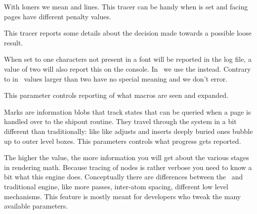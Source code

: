 \stopnewprimitive

\startnewprimitive[title={\prm {tracingloners}}]

With loners we mean  and  lines. This tracer can be
handy when  is set and facing pages have different
penalty values.

\stopnewprimitive

\startnewprimitive[title={\prm {tracinglooseness}}]

This tracer reports some details about the decision made towards a possible
loose result.

\stopnewprimitive

\startoldprimitive[title={\prm {tracinglostchars}}]

When set to one characters not present in a font will be reported in the log
file, a value of two will also report this on the console. In \CONTEXT\ we use
the  instead. Contrary to in \LUATEX\ values larger than
two have no special meaning and we don't error.

\stopoldprimitive

\startoldprimitive[title={\prm {tracingmacros}}]

This parameter controls reporting of what macros are seen and expanded.

\stopoldprimitive

\startnewprimitive[title={\prm {tracingmarks}}]

Marks are information blobs that track states that can be queried when a page is
handled over to the shipout routine. They travel through the system in a bit
different than traditionally: like like adjusts and inserts deeply buried ones
bubble up to outer level boxes. This parameters controls what progress gets
reported.

\stopnewprimitive

\startnewprimitive[title={\prm {tracingmath}}]

The higher the value, the more information you will get about the various stages
in rendering math. Because tracing of nodes is rather verbose you need to know a
bit what this engine does. Conceptually there are differences between the
\LUAMETATEX\ and traditional engine, like more passes, inter-atom spacing,
different low level mechanisms. This feature is mostly meant for developers who
tweak the many available parameters.

\stopnewprimitive

\startnewprimitive[title={\prm {tracingmvl}}]

